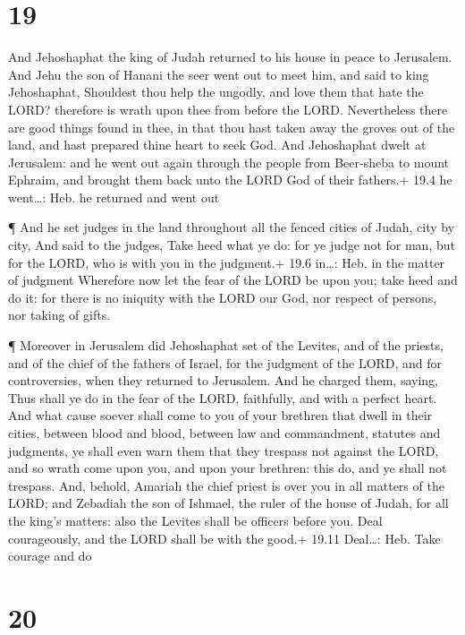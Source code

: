 \hypertarget{section-18}{%
\section{19}\label{section-18}}

 And Jehoshaphat the king of Judah returned to his house in
peace to Jerusalem.  And Jehu the son of Hanani the seer
went out to meet him, and said to king Jehoshaphat, Shouldest thou help
the ungodly, and love them that hate the LORD? therefore is wrath upon
thee from before the LORD.  Nevertheless there are good
things found in thee, in that thou hast taken away the groves out of the
land, and hast prepared thine heart to seek God.  And
Jehoshaphat dwelt at Jerusalem: and he went out again through the people
from Beer-sheba to mount Ephraim, and brought them back unto the LORD
God of their fathers.+ 19.4 he went\ldots: Heb. he returned and went out

 ¶ And he set judges in the land throughout all the fenced
cities of Judah, city by city,  And said to the judges, Take
heed what ye do: for ye judge not for man, but for the LORD, who is with
you in the judgment.+ 19.6 in\ldots: Heb. in the matter of judgment
 Wherefore now let the fear of the LORD be upon you; take
heed and do it: for there is no iniquity with the LORD our God, nor
respect of persons, nor taking of gifts.

 ¶ Moreover in Jerusalem did Jehoshaphat set of the Levites,
and of the priests, and of the chief of the fathers of Israel, for the
judgment of the LORD, and for controversies, when they returned to
Jerusalem.  And he charged them, saying, Thus shall ye do in
the fear of the LORD, faithfully, and with a perfect heart.
 And what cause soever shall come to you of your brethren
that dwell in their cities, between blood and blood, between law and
commandment, statutes and judgments, ye shall even warn them that they
trespass not against the LORD, and so wrath come upon you, and upon your
brethren: this do, and ye shall not trespass.  And, behold,
Amariah the chief priest is over you in all matters of the LORD; and
Zebadiah the son of Ishmael, the ruler of the house of Judah, for all
the king's matters: also the Levites shall be officers before you. Deal
courageously, and the LORD shall be with the good.+ 19.11 Deal\ldots:
Heb. Take courage and do

\hypertarget{section-19}{%
\section{20}\label{section-19}}

